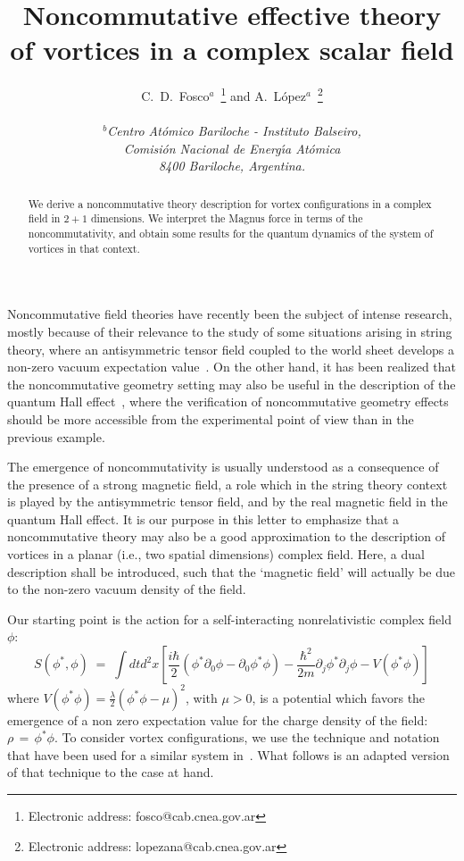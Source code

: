 \documentclass[a4paper,12pt]{article} \tolerance=200
\title{Noncommutative effective theory of vortices in a 
complex scalar field}
\author{C.~D.~Fosco$^a$~\footnote{Electronic address:
    fosco@cab.cnea.gov.ar} and A.~L{\'o}pez$^a$~\footnote{Electronic
    address: lopezana@cab.cnea.gov.ar}
  \\ \\
  {\normalsize\it $^b$Centro At{\'o}mico Bariloche - Instituto Balseiro,}\\
  {\normalsize\it Comisi{\'o}n Nacional de Energ{\'\i}a At{\'o}mica}\\
  {\normalsize\it 8400 Bariloche, Argentina.}}  \date{}
\begin{document}
\maketitle
\begin{abstract}
\noindent We derive a noncommutative theory description for vortex
configurations in a complex field in $2+1$ dimensions.  We interpret
the Magnus force in terms of the noncommutativity, and obtain some
results for the quantum dynamics of the system of vortices in that
context.
\end{abstract}
\newpage 
Noncommutative field theories have recently been the subject of
intense research, mostly because of their relevance to the study of
some situations arising in string theory, where an antisymmetric
tensor field coupled to the world sheet develops a non-zero vacuum
expectation value~\cite{DN,castellani}. On the other hand, it has been
realized that the noncommutative geometry setting may also be useful
in the description of the quantum Hall
effect~\cite{susskind,AP,KS,MaSt}, where the verification of
noncommutative geometry effects should be more accessible from the
experimental point of view than in the previous example.

The emergence of noncommutativity is usually understood as a
consequence of the presence of a strong magnetic field, a role which
in the string theory context is played by the antisymmetric tensor
field, and by the real magnetic field in the quantum Hall effect. It
is our purpose in this letter to emphasize that a noncommutative
theory may also be a good approximation to the description of vortices
in a planar (i.e., two spatial dimensions) complex field.  Here, a
dual description shall be introduced, such that the `magnetic field'
will actually be due to the non-zero vacuum density of the field.


Our starting point is the action for a self-interacting
nonrelativistic complex field $\phi$:
\begin{equation}\label{eq:defs} 
S(\phi^*,\phi) \;=\; \int dt d^2x
\left[
\frac{i\hbar}{2} (\phi^* \partial_0 \phi - \partial_0 \phi^*\phi) 
- \frac{\hbar^2}{2 m}\partial_j\phi^* \partial_j \phi - V(\phi^*\phi) 
\right]
\end{equation}
where $V(\phi^* \phi) = \frac{\lambda}{2}(\phi^* \phi - \mu)^2$, with $\mu > 0$, is a
potential which favors the emergence of a non zero expectation value
for the charge density of the field: $\rho\,=\,\phi^*\phi$. To consider vortex
configurations, we use the technique and notation that have been used
for a similar system in~\cite{Zhang,MS}. What follows is an adapted
version of that technique to the case at hand.
\end{document}
